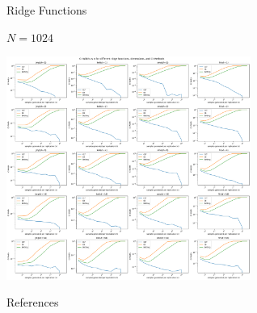 \documentclass[11pt,compress,xcolor={usenames,dvipsnames},aspectratio=169]{beamer}
\begin{document}
\begin{frame}{Ridge Functions}

$N = 1024$

\vspace{-10ex}

\centerline{\includegraphics[width=0.6\textwidth]{Figures/ridge.png}}
    
\end{frame}



\begin{frame}[allowframebreaks]{References}
\printbibliography
\end{frame}
\end{document}
